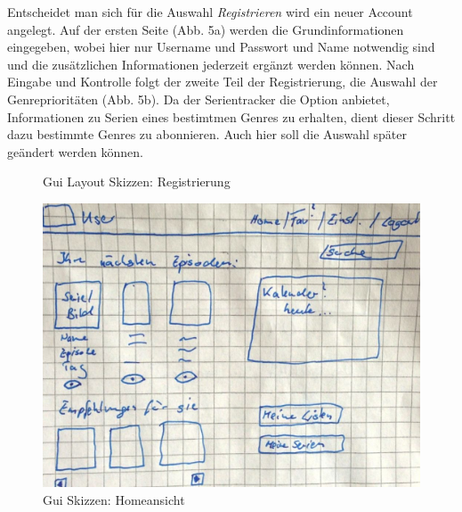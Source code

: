 \newpage

Entscheidet man sich für die Auswahl \textit{Registrieren} wird ein neuer Account angelegt. Auf der ersten Seite (Abb. 5a) werden die Grundinformationen eingegeben, wobei hier nur Username und Passwort und Name notwendig sind und die zusätzlichen Informationen jederzeit ergänzt werden können. Nach Eingabe und Kontrolle folgt der zweite Teil der Registrierung, die Auswahl der Genreprioritäten (Abb. 5b). Da der Serientracker die Option anbietet, Informationen zu Serien eines bestimtmen Genres zu erhalten, dient dieser Schritt dazu bestimmte Genres zu abonnieren. Auch hier soll die Auswahl später geändert werden können.\\

\begin{figure}[h!]
\centering
\hfill
{}
\hfill %
\hfill %
\caption{Gui Layout Skizzen: Registrierung }
\label{Gui}
\end{figure}

\parskip 12pt
\parindent 0pt


\begin{figure}
\centering
\includegraphics[width=.5\textwidth]{../images/dokulayout/home.jpg}
\caption{Gui Skizzen: Homeansicht}
\end{figure}

